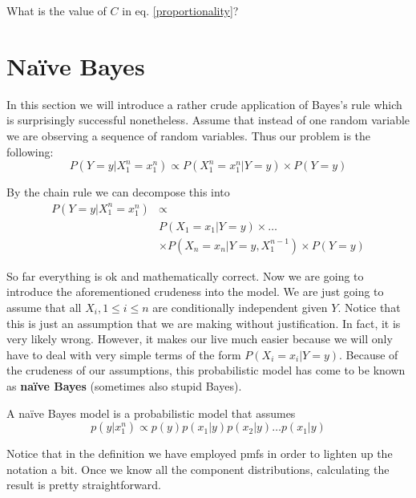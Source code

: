 \begin{Exercise}
What is the value of $ C $ in eq. \ref{proportionality}?
\end{Exercise}



\section{Na\"ive Bayes}
In this section we will introduce a rather crude application of Bayes's rule which is surprisingly successful nonetheless.
Assume that instead of one random variable we are observing a sequence of random variables. Thus our problem is the following:
\begin{equation}
P(Y=y|X_{1}^{n}=x_{1}^{n}) \propto P(X_{1}^{n}=x_{1}^{n}|Y=y) \times P(Y=y) 
\end{equation}

By the chain rule we can decompose this into
\begin{align}
P(Y=y|X_{1}^{n}=x_{1}^{n}) &\propto \\
&P(X_{1}=x_{1}|Y=y) \times \ldots \nonumber \\
&\times P(X_{n}=x_{n}|Y=y,X_{1}^{n-1}) \times P(Y=y) \nonumber
\end{align}

So far everything is ok and mathematically correct. Now we are going to introduce the aforementioned crudeness into the model.
We are just going to assume that all $ X_{i}, 1 \leq i \leq n  $ are conditionally independent given $ Y $. Notice that
this is just an assumption that we are making without justification. In fact, it is very likely wrong. However, it makes our
live much easier because we will only have to deal with very simple terms of the form $ P(X_{i}=x_{i}|Y=y) $. Because of the
crudeness of our assumptions, this probabilistic model has come to be known as \textbf{na\"ive Bayes} (sometimes also 
stupid Bayes).

\begin{Definition}
A na\"ive Bayes model is a probabilistic model that assumes
$$ p(y|x_{1}^{n}) \propto p(y)p(x_{1}|y)p(x_{2}|y)\ldots p(x_{1}|y) $$
\end{Definition}

Notice that in the definition we have employed pmfs in order to lighten up the notation a bit. Once we know all the component
distributions, calculating the result is pretty straightforward. 

